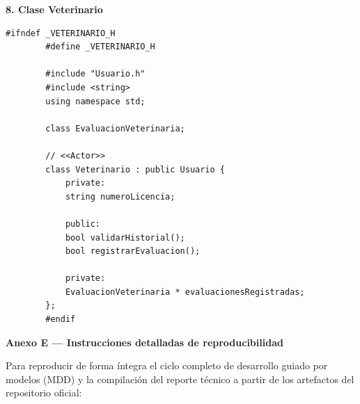 \documentclass[journal,onecolumn]{IEEEtran}
\begin{document}
	\textbf{8. Clase Veterinario}
	\begin{lstlisting}[caption={Clase Veterinario (Veterinario.h).}]
		#ifndef _VETERINARIO_H
		#define _VETERINARIO_H
		
		#include "Usuario.h"
		#include <string>
		using namespace std;
		
		class EvaluacionVeterinaria;
		
		// <<Actor>>
		class Veterinario : public Usuario {
			private:
			string numeroLicencia;
			
			public:
			bool validarHistorial();
			bool registrarEvaluacion();
			
			private:
			EvaluacionVeterinaria * evaluacionesRegistradas;
		};
		#endif
	\end{lstlisting}
	
	\newpage
	\textbf{Anexo E --- Instrucciones detalladas de reproducibilidad}
	\label{anexo:reproducibilidad}
	
	Para reproducir de forma íntegra el ciclo completo de desarrollo guiado por modelos (MDD) y la compilación del reporte técnico a partir de los artefactos del repositorio oficial:
	
\end{document}
